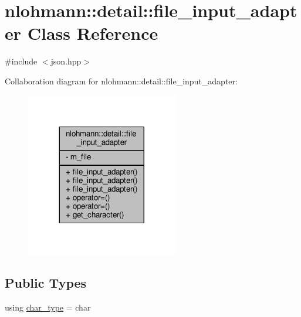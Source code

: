 \hypertarget{classnlohmann_1_1detail_1_1file__input__adapter}{}\section{nlohmann\+:\+:detail\+:\+:file\+\_\+input\+\_\+adapter Class Reference}
\label{classnlohmann_1_1detail_1_1file__input__adapter}


{\ttfamily \#include $<$json.\+hpp$>$}



Collaboration diagram for nlohmann\+:\+:detail\+:\+:file\+\_\+input\+\_\+adapter\+:
\nopagebreak
\begin{figure}[H]
\begin{center}
\leavevmode
\includegraphics[width=188pt]{classnlohmann_1_1detail_1_1file__input__adapter__coll__graph}
\end{center}
\end{figure}
\subsection*{Public Types}
\begin{DoxyCompactItemize}
\item 
using \hyperlink{classnlohmann_1_1detail_1_1file__input__adapter_ac853c96c60f93dc97433dacd98179f35}{char\+\_\+type} = char
\end{DoxyCompactItemize}
